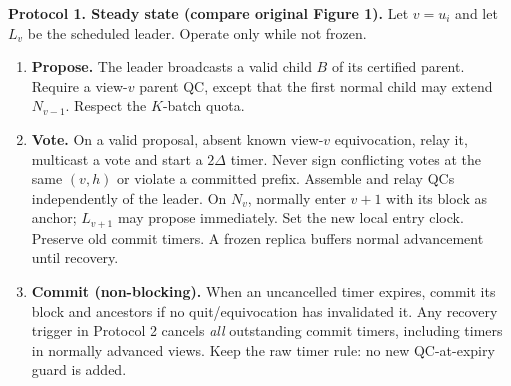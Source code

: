 \documentclass[10pt,a4paper]{article}
\newcommand{\chg}[1]{\textcolor{red!70!black}{#1}}
\begin{document}
\begin{mdframed}[linewidth=.6pt,innertopmargin=5pt,innerbottommargin=5pt]
\textbf{Protocol 1. Steady state (compare original Figure 1).}
Let $v=u_i$ and let $L_v$ be the scheduled leader. Operate only while not frozen.
\begin{enumerate}[label=\textbf{\arabic*.},itemsep=3pt]
\item \textbf{Propose.} The leader broadcasts a valid child $B$ of its
certified parent. Require a view-$v$ parent QC, \chg{except that the first
normal child may extend $N_{v-1}$. Respect the $K$-batch quota.}
\item \textbf{Vote.} On a valid proposal, absent known view-$v$
equivocation, relay it, multicast a vote and start a $2\Delta$ timer.
Never sign conflicting votes at the same $(v,h)$ or violate a committed
prefix. Assemble and relay QCs independently of the leader.
\chg{On $N_v$, normally enter $v+1$ with its block as anchor; $L_{v+1}$
may propose immediately. Set the new local entry clock. Preserve old commit
timers. A frozen replica buffers normal advancement until recovery.}
\item \textbf{Commit (non-blocking).} When an uncancelled timer expires,
commit its block and ancestors if no quit/equivocation has invalidated it.
\chg{Any recovery trigger in Protocol 2 cancels \emph{all} outstanding
commit timers, including timers in normally advanced views.}
Keep the raw timer rule: no new QC-at-expiry guard is added.
\end{enumerate}
\end{mdframed}
\end{document}
